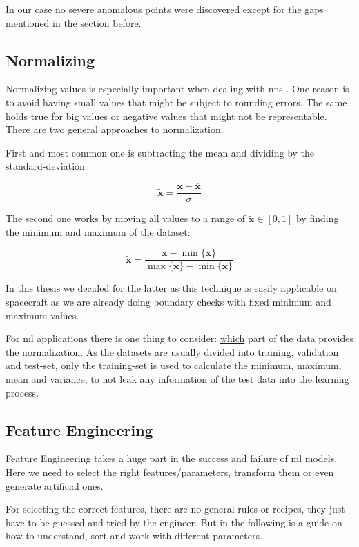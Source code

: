 	In our case no severe anomalous points were discovered except for the gaps mentioned in the section before.
	
	\subsection{Normalizing}
	Normalizing values is especially important when dealing with \acp{nn} \cite[p. 101ff]{python-deep-learning}. One reason is to avoid having small values that might be subject to rounding errors. The same holds true for big values or negative values that might not be representable.	There are two general approaches to normalization. 
	
	First and most common one is subtracting the mean and dividing by the standard-deviation: 

	\begin{equation}
	\tilde{\mathbf{x}} = \frac{\mathbf{x} - \overline{\mathbf{x}}}{\sigma}
	\end{equation}		
	
	The second one works by moving all values to a range of $\tilde{\mathbf{x}}\in [0, 1]$ by finding the minimum and maximum of the dataset: 
	
	\begin{equation}
	\tilde{\mathbf{x}} = \frac{\mathbf{x} - \min \{\mathbf{x}\}}{\max\{\mathbf{x}\} - \min\{\mathbf{x}\}}
	\end{equation}		

	In this thesis we decided for the latter as this technique is easily applicable on spacecraft as we are already doing boundary checks with fixed minimum and maximum values.
	
	For \ac{ml} applications there is one thing to consider: \underline{which} part of the data provides the normalization. As the datasets are usually divided into training, validation and test-set, only the training-set is used to calculate the minimum, maximum, mean and variance, to not leak any information of the test data into the learning process.

	\subsection{Feature Engineering}
	Feature Engineering takes a huge part in the success and failure of \ac{ml} models. Here we need to select the right features/parameters, transform them or even generate artificial ones.
	
	For selecting the correct features, there are no general rules or recipes, they just have to be guessed and tried by the engineer. But in the following is a guide on how to understand, sort and work with different parameters.
	
